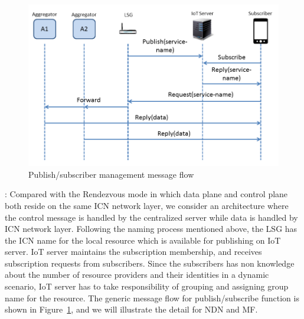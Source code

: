 \begin{figure}
\includegraphics[width=\columnwidth]{figure/pub_sub.png}
\caption{\label{fig:pubsub}Publish/subscriber management message flow}
\end{figure}
\vspace{1mm}: Compared with the Rendezvous mode in which data plane and control plane both reside on the same ICN network layer, we consider an architecture where the control message is handled by the centralized server while data is handled by ICN network layer.  Following the naming process mentioned above, the LSG has the ICN name for the local resource which is available for publishing on IoT server.  IoT server maintains the subscription membership, and receives subscription requests from subscribers. Since the subscribers has non knowledge about the number of resource providers and their identities  in a dynamic scenario,  IoT server has to take responsibility of grouping and assigning group name for the resource. The generic message flow for publish/subscribe function is shown in Figure~\ref{fig:pubsub}, and we will illustrate the detail for NDN and MF.
